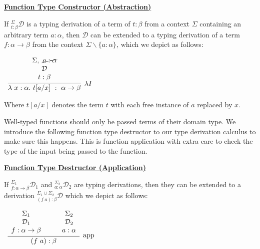 \documentclass{book}
\begin{document}
        \begin{mdframed}

            \underline{{\bf Function Type Constructor (Abstraction)}}
    
            If $^{\Sigma}_{t : \beta}\mathcal{D}$ is a typing derivation of a term of  $t : \beta$ from a context $\Sigma$ containing an arbitrary term $a : \alpha$, then $\mathcal{D}$ can be extended to a typing derivation of a term $f : \alpha \rightarrow \beta$ from the context $\Sigma \backslash \{a : \alpha\}$, which we depict as follows: 
    
            \begin{center}
                $\begin{array}{c}		
                    \infer[\lambda I]{\lambda \ x : \alpha. \ t[a/x] \ : \ \alpha \rightarrow \beta}
                        {\begin{array}{c} \Sigma, \ \cancel{a : \alpha} \\ \mathcal{D} \\ t : \beta \end{array}}
                \end{array}$
            \end{center}

            Where $t[a/x]$ denotes the term $t$ with each free instance of $a$ replaced by $x$. 
        \end{mdframed}
    
            Well-typed functions should only be passed terms of their domain type. We introduce the following function type destructor to our type derivation calculus to make sure this happens. This is function application with extra care to check the type of the input being passed to the function. 
        
        \begin{mdframed}
    
            \underline{{\bf Function Type Destructor (Application)}}
    
            If $^{\Sigma_{1}}_{f : \alpha \rightarrow \beta}\mathcal{D}_{1}$ and $^{\Sigma_{2}}_{a : \alpha}\mathcal{D}_{2}$ are typing derivations, then they can be extended to a derivation $^{\Sigma_{1}\cup \Sigma_{2}}_{(f \ a) : \beta}\mathcal{D}$ which we depict as follows: 
    
            \begin{center}
                $\begin{array}{c}		
                    \infer[\app]{(f \ a) : \beta}{\begin{array}{c} \Sigma_{1} \\ \mathcal{D}_{1} \\ f : \alpha \rightarrow \beta \end{array} \quad & \begin{array}{c} \Sigma_{2} \\ \mathcal{D}_{2} \\  a : \alpha \end{array}}	
                \end{array}$
            \end{center}
        \end{mdframed}
    
\end{document}
